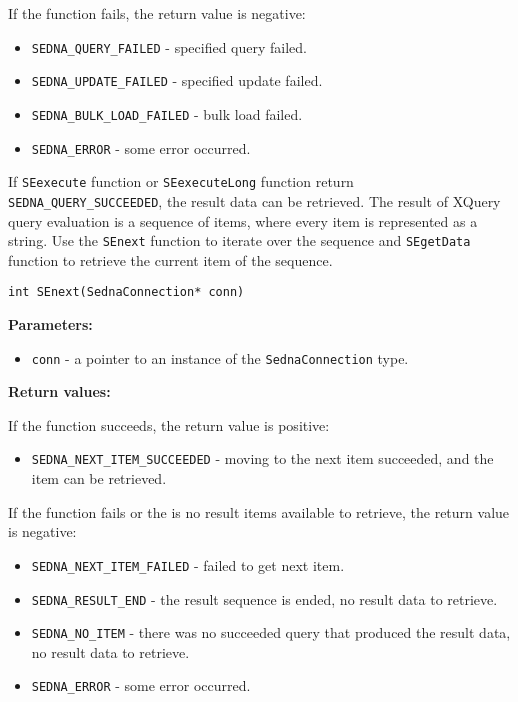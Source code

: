 \documentclass[a4paper,12pt]{article}
\newenvironment{citemize}
{\begin{itemize}
  \setlength{\itemsep}{0pt}
  \setlength{\parskip}{0pt}
  \setlength{\parsep}{0pt}}
{\end{itemize}}
\begin{document}
\noindent
If the function fails, the return value is negative:

\begin{citemize}
\item\verb!SEDNA_QUERY_FAILED! - specified query failed.
\item\verb!SEDNA_UPDATE_FAILED! - specified update failed.
\item\verb!SEDNA_BULK_LOAD_FAILED! - bulk load failed.
\item\verb!SEDNA_ERROR! - some error occurred.
\end{citemize}

If \verb!SEexecute! function or \verb!SEexecuteLong! function return
\verb!SEDNA_QUERY_SUCCEEDED!, the result data can be retrieved. The result of
XQuery query evaluation is a sequence of items, where every item is represented
as a string. Use the \verb!SEnext! function to iterate over the sequence and
\verb!SEgetData! function to retrieve the current item of the sequence.

\begin{verbatim}
int SEnext(SednaConnection* conn)
\end{verbatim}

\noindent
\textbf{Parameters:}

\begin{citemize}
\item\verb!conn! - a pointer to an instance of the \verb!SednaConnection! type.
\end{citemize}

\noindent
\textbf{Return values:}

\medskip

\noindent
If the function succeeds, the return value is positive:

\begin{citemize}
\item\verb!SEDNA_NEXT_ITEM_SUCCEEDED! - moving to the next item succeeded, and
the item can be retrieved.
\end{citemize}

\noindent
If the function fails or the is no result items available to retrieve, the
return value is negative:

\begin{citemize}
\item\verb!SEDNA_NEXT_ITEM_FAILED! - failed to get next item.
\item\verb!SEDNA_RESULT_END! - the result sequence is ended, no result data to
retrieve.
\item\verb!SEDNA_NO_ITEM! - there was no succeeded query that produced the
result data, no result data to retrieve.
\item\verb!SEDNA_ERROR! - some error occurred.
\end{citemize}
\end{document}
